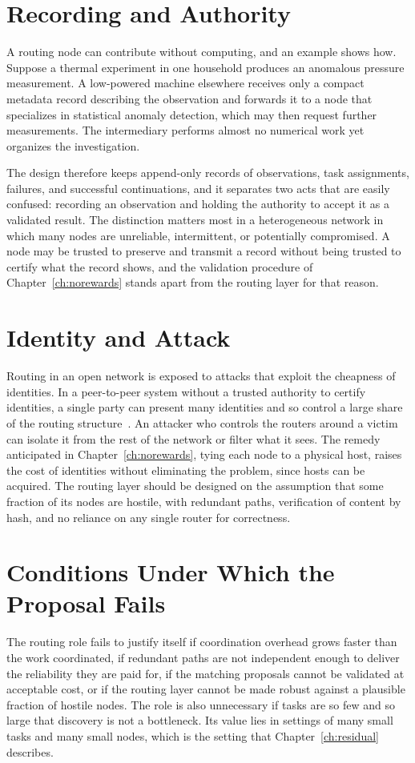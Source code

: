 \section{Recording and Authority}

A routing node can contribute without computing, and an example shows how. Suppose a thermal experiment in one household produces an anomalous pressure measurement. A low-powered machine elsewhere receives only a compact metadata record describing the observation and forwards it to a node that specializes in statistical anomaly detection, which may then request further measurements. The intermediary performs almost no numerical work yet organizes the investigation.

The design therefore keeps append-only records of observations, task assignments, failures, and successful continuations, and it separates two acts that are easily confused: recording an observation and holding the authority to accept it as a validated result. The distinction matters most in a heterogeneous network in which many nodes are unreliable, intermittent, or potentially compromised. A node may be trusted to preserve and transmit a record without being trusted to certify what the record shows, and the validation procedure of Chapter~\ref{ch:norewards} stands apart from the routing layer for that reason.

\section{Identity and Attack}

Routing in an open network is exposed to attacks that exploit the cheapness of identities. In a peer-to-peer system without a trusted authority to certify identities, a single party can present many identities and so control a large share of the routing structure~\cite{douceur2002}. An attacker who controls the routers around a victim can isolate it from the rest of the network or filter what it sees. The remedy anticipated in Chapter~\ref{ch:norewards}, tying each node to a physical host, raises the cost of identities without eliminating the problem, since hosts can be acquired. The routing layer should be designed on the assumption that some fraction of its nodes are hostile, with redundant paths, verification of content by hash, and no reliance on any single router for correctness.

\section{Conditions Under Which the Proposal Fails}

The routing role fails to justify itself if coordination overhead grows faster than the work coordinated, if redundant paths are not independent enough to deliver the reliability they are paid for, if the matching proposals cannot be validated at acceptable cost, or if the routing layer cannot be made robust against a plausible fraction of hostile nodes. The role is also unnecessary if tasks are so few and so large that discovery is not a bottleneck. Its value lies in settings of many small tasks and many small nodes, which is the setting that Chapter~\ref{ch:residual} describes.
